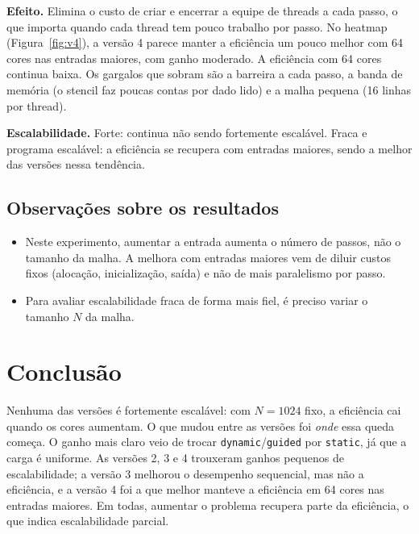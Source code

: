 \documentclass[a4paper,12pt]{article}
\begin{document}
\textbf{Efeito.} Elimina o custo de criar e encerrar a equipe de threads a cada
passo, o que importa quando cada thread tem pouco trabalho por passo. No heatmap
(Figura~\ref{fig:v4}), a versão 4 parece manter a eficiência um pouco melhor
com 64 cores nas entradas maiores, com ganho moderado. A eficiência com 64 cores
continua baixa. Os gargalos que sobram são a barreira a cada passo, a banda de
memória (o stencil faz poucas contas por dado lido) e a malha pequena
(16 linhas por thread).

\textbf{Escalabilidade.} Forte: continua não sendo fortemente escalável. Fraca e
programa escalável: a eficiência se recupera com entradas maiores, sendo a
melhor das versões nessa tendência.

\subsection{Observações sobre os resultados}

\begin{itemize}
    \item Neste experimento, aumentar a entrada aumenta o número de passos, não
          o tamanho da malha. A melhora com entradas maiores vem de diluir
          custos fixos (alocação, inicialização, saída) e não de mais
          paralelismo por passo. 
    \item Para avaliar escalabilidade fraca de forma
          mais fiel, é preciso variar o tamanho $N$ da malha.
\end{itemize}

\section{Conclusão}

Nenhuma das versões é fortemente escalável: com $N=1024$ fixo, a eficiência cai
quando os cores aumentam. O que mudou entre as versões foi \emph{onde} essa
queda começa. O ganho mais claro veio de trocar \texttt{dynamic}/\texttt{guided}
por \texttt{static}, já que a carga é uniforme. As versões 2, 3 e 4 trouxeram
ganhos pequenos de escalabilidade; a versão 3 melhorou o desempenho
sequencial, mas não a eficiência, e a versão 4 foi a que melhor manteve a
eficiência em 64 cores nas entradas maiores. Em todas, aumentar o problema
recupera parte da eficiência, o que indica escalabilidade parcial.
\end{document}

